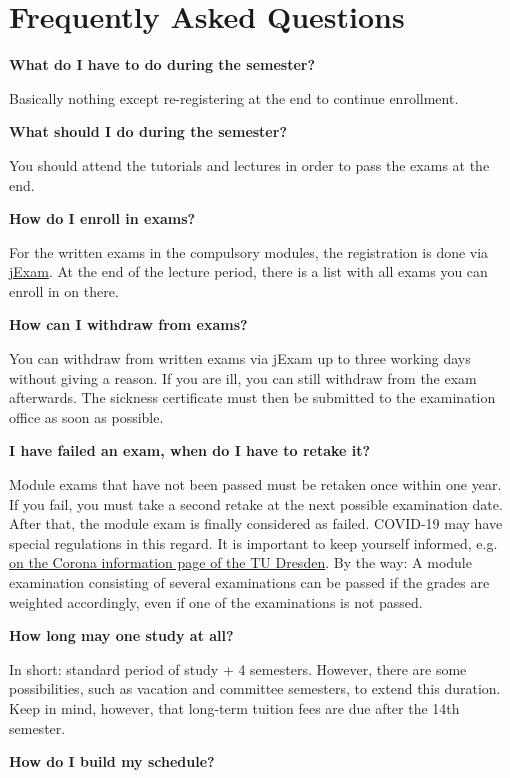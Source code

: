 \chapter{Frequently Asked Questions} \label{sec:faq}

\textbf{What do I have to do during the semester?}

Basically nothing except re-registering at the end to continue enrollment.

\textbf{What should I do during the semester?}

You should attend the tutorials and lectures in order to pass the exams at the end.

\textbf{How do I enroll in exams?}

For the written exams in the compulsory modules, the registration is done via \href{https://jexam.inf.tu-dresden.de/}{jExam}.
At the end of the lecture period, there is a list with all exams you can enroll in on there.

\textbf{How can I withdraw from exams?}

You can withdraw from written exams via jExam up to three working days without giving a reason. If you are ill, you can still withdraw from the exam afterwards. The sickness certificate must then be submitted to the examination office as soon as possible.

\textbf{I have failed an exam, when do I have to retake it?}

Module exams that have not been passed must be retaken once within one year. If you fail, you must take a second retake at the next possible examination date. After that, the module exam is finally considered as failed. COVID-19 may have special regulations in this regard. It is important to keep yourself informed, e.g. 
\href{https://tu-dresden.de/tu-dresden/gesundheitsmanagement/information-regarding-covid-19-coronavirus-sars-cov-2}{on the Corona information page of the TU Dresden}. 
By the way: A module examination consisting of several examinations can be passed if the grades are weighted accordingly, even if one of the examinations is not passed.

\textbf{How long may one study at all?}

In short: standard period of study + 4 semesters. However, there are some possibilities, such as vacation and committee semesters, to extend this duration. Keep in mind, however, that long-term tuition fees are due after the 14th semester.

\textbf{How do I build my schedule?}

